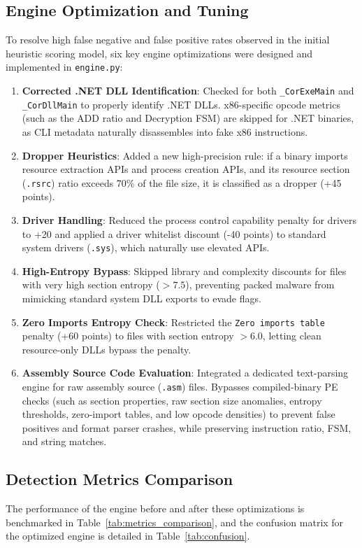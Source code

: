 \documentclass[11pt,a4paper]{article}
\begin{document}
\subsection{Engine Optimization and Tuning}
To resolve high false negative and false positive rates observed in the initial heuristic scoring model, six key engine optimizations were designed and implemented in \texttt{engine.py}:
\begin{enumerate}
    \item \textbf{Corrected .NET DLL Identification}: Checked for both \texttt{\_CorExeMain} and \texttt{\_CorDllMain} to properly identify .NET DLLs. x86-specific opcode metrics (such as the ADD ratio and Decryption FSM) are skipped for .NET binaries, as CLI metadata naturally disassembles into fake x86 instructions.
    \item \textbf{Dropper Heuristics}: Added a new high-precision rule: if a binary imports resource extraction APIs and process creation APIs, and its resource section (\texttt{.rsrc}) ratio exceeds 70\% of the file size, it is classified as a dropper (+45 points).
    \item \textbf{Driver Handling}: Reduced the process control capability penalty for drivers to +20 and applied a driver whitelist discount (-40 points) to standard system drivers (\texttt{.sys}), which naturally use elevated APIs.
    \item \textbf{High-Entropy Bypass}: Skipped library and complexity discounts for files with very high section entropy ($>7.5$), preventing packed malware from mimicking standard system DLL exports to evade flags.
    \item \textbf{Zero Imports Entropy Check}: Restricted the \texttt{Zero imports table} penalty (+60 points) to files with section entropy $>6.0$, letting clean resource-only DLLs bypass the penalty.
    \item \textbf{Assembly Source Code Evaluation}: Integrated a dedicated text-parsing engine for raw assembly source (\texttt{.asm}) files. Bypasses compiled-binary PE checks (such as section properties, raw section size anomalies, entropy thresholds, zero-import tables, and low opcode densities) to prevent false positives and format parser crashes, while preserving instruction ratio, FSM, and string matches.
\end{enumerate}

\subsection{Detection Metrics Comparison}
The performance of the engine before and after these optimizations is benchmarked in Table~\ref{tab:metrics_comparison}, and the confusion matrix for the optimized engine is detailed in Table~\ref{tab:confusion}.
\end{document}
